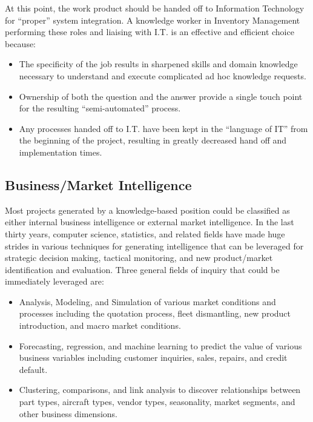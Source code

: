 \documentclass[letterpaper]{article}
\begin{document}
    At this point, the work product should be handed off to Information Technology
    for ``proper'' system integration.  A knowledge worker in Inventory
    Management performing these roles and liaising with I.T. is an effective
    and efficient choice because:

    \begin{itemize}
        \item The specificity of the job results in sharpened skills and domain
        knowledge necessary to understand and execute complicated ad hoc knowledge
        requests.

        \item Ownership of both the question and the answer provide a single touch
        point for the resulting ``semi-automated'' process.

        \item Any processes handed off to I.T. have been kept in the ``language
        of IT'' from the beginning of the project, resulting in greatly decreased
        hand off and implementation times.
    \end{itemize}

    \subsection{Business/Market Intelligence}

    Most projects generated by a knowledge-based position could be classified
    as either internal business intelligence or external market intelligence.
    In the last thirty years, computer science, statistics, and related fields
    have made huge strides in various techniques for generating intelligence
    that can be leveraged for strategic decision making, tactical monitoring,
    and new product/market identification and evaluation.  Three general
    fields of inquiry that could be immediately leveraged are:

    \begin{itemize}
        \item Analysis, Modeling, and Simulation of various market conditions
        and processes including the quotation process, fleet dismantling,
        new product introduction, and macro market conditions.
        
        \item Forecasting, regression, and machine learning to predict the
        value of various business variables including customer inquiries,
        sales, repairs, and credit default.

        \item Clustering, comparisons, and link analysis to discover relationships
        between part types, aircraft types, vendor types, seasonality, market
        segments, and other business dimensions.
    \end{itemize}
\end{document}
